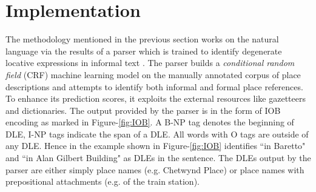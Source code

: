\documentclass{acm_proc_article-sp}
\begin{document}


\section{Implementation}
The methodology mentioned in the previous section works on the natural language via the results of a parser which is trained to identify degenerate locative expressions in informal text \cite{fei:locative}. 
The parser builds a \textit{conditional random field} (CRF) machine learning model on the manually annotated corpus of place descriptions \cite{tuw} and attempts to identify both informal and formal place references. To enhance its prediction scores, it exploits the external resources like gazetteers and dictionaries. The output provided by the parser is in the form of IOB encoding as marked in Figure-\ref{fig:IOB}. A B-NP tag denotes the beginning of DLE, I-NP tags indicate the span of a DLE. All words with O tags are outside of any DLE. Hence in the example shown in Figure-\ref{fig:IOB} identifies ``in Baretto" and ``in Alan Gilbert Building" as DLEs in the sentence. The DLEs output by the parser are either simply place names (e.g. Chetwynd Place) or place names with prepositional attachments (e.g. of the train station).
\end{document}
